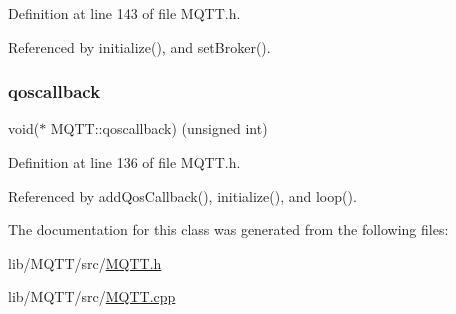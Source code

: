 Definition at line 143 of file M\+Q\+T\+T.\+h.



Referenced by initialize(), and set\+Broker().

\mbox{\label{class_m_q_t_t_a3b5999625aa19e5198896195b5b5149c}} 
\subsubsection{\texorpdfstring{qoscallback}{qoscallback}}
{\footnotesize\ttfamily void($\ast$ M\+Q\+T\+T\+::qoscallback) (unsigned int)\hspace{0.3cm}{\ttfamily [private]}}



Definition at line 136 of file M\+Q\+T\+T.\+h.



Referenced by add\+Qos\+Callback(), initialize(), and loop().



The documentation for this class was generated from the following files\+:\begin{DoxyCompactItemize}
\item 
lib/\+M\+Q\+T\+T/src/\hyperlink{_m_q_t_t_8h}{M\+Q\+T\+T.\+h}\item 
lib/\+M\+Q\+T\+T/src/\hyperlink{_m_q_t_t_8cpp}{M\+Q\+T\+T.\+cpp}\end{DoxyCompactItemize}
